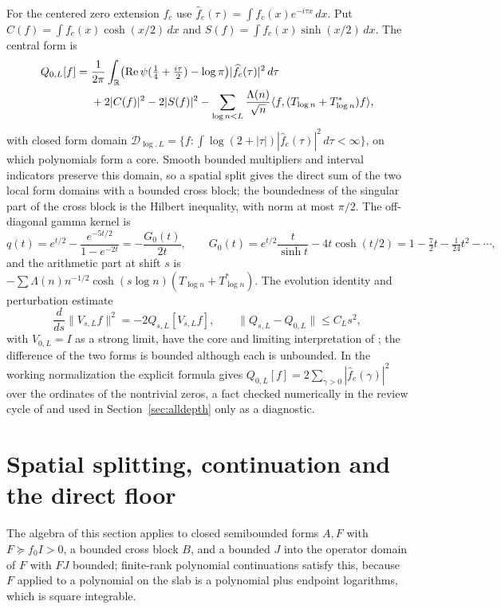 \documentclass[11pt]{article}
\numberwithin{equation}{section}
\theoremstyle{definition}
\theoremstyle{remark}
\newcommand{\DD}{\mathcal D}
\newcommand{\RR}{\mathbb R}
\newcommand{\Rea}{\operatorname{Re}}
\newcommand{\norm}[1]{\lVert#1\rVert}
\newcommand{\ip}[2]{\langle#1,#2\rangle}
\begin{document}
For the centered zero extension $f_c$ use $\widehat f_c(\tau)=\int f_c(x)e^{-i\tau x}\,dx$. Put $C(f)=\int f_c(x)\cosh(x/2)\,dx$ and $S(f)=\int f_c(x)\sinh(x/2)\,dx$. The central form is
\begin{align}\label{eq:Q}
 Q_{0,L}[f]={}&\frac1{2\pi}\int_{\RR}\bigl(\Rea\psi(\tfrac14+\tfrac{i\tau}{2})-\log\pi\bigr)|\widehat f_c(\tau)|^2\,d\tau\notag\\
 &+2|C(f)|^2-2|S(f)|^2-\sum_{\log n<L}\frac{\Lambda(n)}{\sqrt n}\ip f{(T_{\log n}+T_{\log n}^*)f},
\end{align}
with closed form domain $\DD_{\log,L}=\{f:\int\log(2+|\tau|)|\widehat f_c(\tau)|^2\,d\tau<\infty\}$, on which polynomials form a core. Smooth bounded multipliers and interval indicators preserve this domain, so a spatial split gives the direct sum of the two local form domains with a bounded cross block; the boundedness of the singular part of the cross block is the Hilbert inequality, with norm at most $\pi/2$. The off-diagonal gamma kernel is
\begin{equation}\label{eq:G}
 q(t)=e^{t/2}-\frac{e^{-5t/2}}{1-e^{-2t}}=-\frac{G_0(t)}{2t},\qquad G_0(t)=e^{t/2}\frac{t}{\sinh t}-4t\cosh(t/2)=1-\tfrac72t-\tfrac1{24}t^2-\cdots,
\end{equation}
and the arithmetic part at shift $s$ is $-\sum\Lambda(n)n^{-1/2}\cosh(s\log n)(T_{\log n}+T_{\log n}^*)$. The evolution identity and perturbation estimate
\begin{equation}\label{eq:evolution}
 \frac{d}{ds}\norm{V_{s,L}f}^2=-2Q_{s,L}[V_{s,L}f],\qquad \norm{Q_{s,L}-Q_{0,L}}\le C_Ls^2,
\end{equation}
with $V_{0,L}=I$ as a strong limit, have the core and limiting interpretation of \cite{WeilDepth}; the difference of the two forms is bounded although each is unbounded. In the working normalization the explicit formula gives $Q_{0,L}[f]=2\sum_{\gamma>0}|\widehat f_c(\gamma)|^2$ over the ordinates of the nontrivial zeros, a fact checked numerically in the review cycle of \cite{WeilDepth} and used in Section~\ref{sec:alldepth} only as a diagnostic.

\section{Spatial splitting, continuation and the direct floor}\label{sec:continuation}

The algebra of this section applies to closed semibounded forms $A,F$ with $F\succeq f_0I>0$, a bounded cross block $B$, and a bounded $J$ into the operator domain of $F$ with $FJ$ bounded; finite-rank polynomial continuations satisfy this, because $F$ applied to a polynomial on the slab is a polynomial plus endpoint logarithms, which is square integrable.
\end{document}
